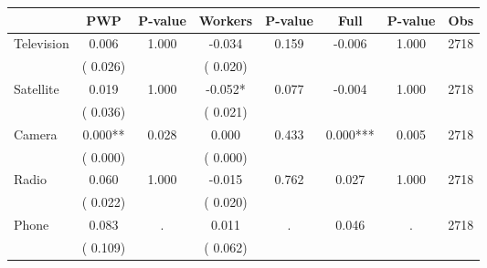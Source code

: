 
\begin{tabular}{l*{7}{c}}\hline&\multicolumn{1}{c}{PWP}&\multicolumn{1}{c}{P-value}&\multicolumn{1}{c}{Workers}&\multicolumn{1}{c}{P-value}&\multicolumn{1}{c}{Full}&\multicolumn{1}{c}{P-value}&\multicolumn{1}{c}{Obs} \\ \hline

 Television       &              0.006       &        1.000  &             -0.034       &        0.159  &             -0.006       &              1.000 &  2718 \\ 
                       &       (       0.026)             &                               &       (       0.020)                     &                               &                                               &                                &                      \\ 

 Satellite       &              0.019       &        1.000  &             -0.052*       &        0.077  &             -0.004       &              1.000 &  2718 \\ 
                       &       (       0.036)             &                               &       (       0.021)                     &                               &                                               &                                &                      \\ 

 Camera       &              0.000**       &        0.028  &              0.000       &        0.433  &              0.000***       &              0.005 &  2718 \\ 
                       &       (       0.000)             &                               &       (       0.000)                     &                               &                                               &                                &                      \\ 

 Radio       &              0.060       &        1.000  &             -0.015       &        0.762  &              0.027       &              1.000 &  2718 \\ 
                       &       (       0.022)             &                               &       (       0.020)                     &                               &                                               &                                &                      \\ 

 Phone       &              0.083       &            .  &              0.011       &            .  &              0.046       &                  . &  2718 \\ 
                       &       (       0.109)             &                               &       (       0.062)                     &                               &                                               &                                &                      \\ 

\hline \end{tabular}